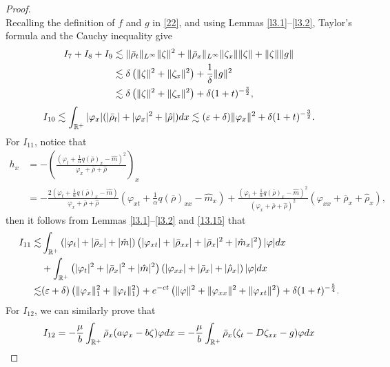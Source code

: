 \documentclass[10pt,a4paper]{amsart}
\begin{document}
\begin{proof}
\begin{equation}
		\end{equation}
		Recalling the definition of $f$ and $g$ in \eqref{22}, and using Lemmas \ref{l3.1}--\ref{l3.2}, Taylor's formula and the Cauchy inequality give
		\begin{align}\label{I789}
			I_{7}+I_{8}+I_9&\lesssim\|\bar\rho_t\|_{L^{\infty}}\|\zeta\|^2+\|\bar\rho_x\|_{L^{\infty}}\|\zeta_x\|\|\zeta\|+\|\zeta\|\|g\|\notag\\
			 &\lesssim \delta\left(\|\zeta\|^2+\|\zeta_x\|^2\right)+\frac{1}{\delta}\|g\|^2\notag\\&\lesssim\delta\left(\|\zeta\|^2+\|\zeta_x\|^2\right)+\delta(1+t)^{-\frac{3}{2}},
		\end{align}
		\begin{equation}\label{I10}
			I_{10}\lesssim \int_{\mathbb{R^+}}|\varphi_x|(|\bar\rho_t|+|\varphi_x|^2+|\hat \rho|){\rm d}x\lesssim(\varepsilon+\delta)\|\varphi_x\|^2+\delta(1+t)^{-\frac{3}{2}}.
		\end{equation}
		For  $I_{11}$, notice that
		\begin{align}\label{hx}
			h_x&=-\left(\frac{\left(\varphi_t+\frac{1}{\alpha}q(\bar\rho)_x-\hat m\right)^2}{\varphi_x+\bar\rho+\hat\rho}\right)_x\nonumber\\
			&=-\frac{2\left(\varphi_t+\frac{1}{\alpha}q(\bar\rho)_x-\hat m\right)}{\varphi_x+\bar\rho+\hat\rho}\left(\varphi_{xt}+\frac{1}{\alpha}q(\bar\rho)_{xx}-\hat m_x\right)+\frac{\left(\varphi_t+\frac{1}{\alpha}q(\bar\rho)_x-\hat m\right)^2}{\left(\varphi_x+\bar\rho+\hat\rho\right)^2}\left(\varphi_{xx}+\bar\rho_{x}+\hat\rho_x\right),
		\end{align}
		then it follows from Lemmas \ref{l3.1}--\ref{l3.2} and \eqref{13.15} that
		\begin{align}\label{I11}
			I_{11}\lesssim&
			\int_{\mathbb{R}^+}\left(|\varphi_t|+|\bar\rho_x|+|\hat m|\right)\left(|\varphi_{xt}|+|\bar\rho_{xx}|+|\bar\rho_x|^2+|\hat m_x|^2\right)|\varphi|{\rm d}x\notag\\
			&+\int_{\mathbb{R}^+}\left(|\varphi_t|^2+|\bar\rho_x|^2+|\hat m|^2\right)\left(|\varphi_{xx}|+|\bar\rho_{x}|+|\hat\rho_x|\right)|\varphi|{\rm d}x\notag\\
			\lesssim&(\varepsilon+\delta)\left(\|\varphi_x\|_1^2+\|\varphi_t\|_1^2\right)+{\rm e}^{-ct}\left(\|\varphi\|^2+\|\varphi_{xx}\|^2+\|\varphi_{xt}\|^2\right) +\delta(1+t)^{-\frac{5}{4}}.
		\end{align}
		For $I_{12}$, we can similarly prove that
		\begin{align}\label{I12}
			I_{12}&=-\frac{\mu}{b}\int_{\mathbb{R}^+}\bar\rho_x(a\varphi_x-b\zeta)\varphi{\rm d}x=-\frac{\mu}{b}\int_{\mathbb{R}^+}\bar\rho_x(\zeta_t-D\zeta_{xx}-g)\varphi{\rm d}x\notag\\

\end{align}
\end{proof}
\end{document}
